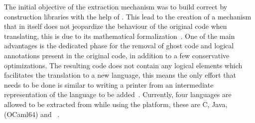 The initial objective of the extraction mechanism was to build correct by construction libraries with the help of \whythree. This lead
to the creation of a mechanism that in itself does not jeopardize the behaviour of the original code when translating, this is due to its 
mathematical formalization~\cite{Pereira18}. One of the main advantages is the dedicated phase for the removal of ghost code and logical
annotations present in the original \whyml code, in addition to a few conservative optimizations. The resulting code does not contain 
any logical elements which facilitates the translation to a new language, this means the only effort that needs to be done
is similar to writing a printer from an intermediate representation of the language to be added~\cite{Pereira18}. Currently, four languages 
are allowed to be extracted from \whyml while using the \whythree platform, these are C, Java, \ocaml (OCaml64) and 
\cml~\cite{Why3Extract, Pereira18}.